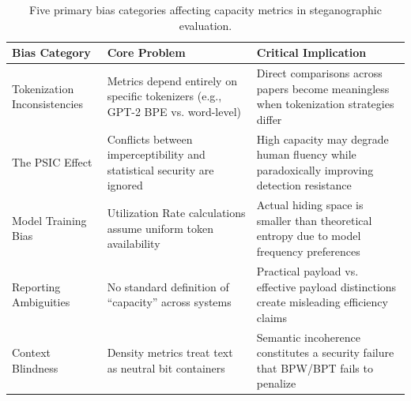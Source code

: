 \begin{table}[t]
  \centering
  \footnotesize
  \caption{Five primary bias categories affecting capacity metrics in steganographic evaluation.}
  \label{tab:capacity_bias_categories}
  \begin{tabular}{|>{\raggedright\arraybackslash}p{2cm}|>{\raggedright\arraybackslash}p{4.5cm}|>{\raggedright\arraybackslash}p{5cm}|}
    \hline
    \textbf{Bias Category}       & \textbf{Core Problem}                                                           & \textbf{Critical Implication}                                                              \\
    \hline
    Tokenization Inconsistencies & Metrics depend entirely on specific tokenizers (e.g., GPT-2 BPE vs. word-level) & Direct comparisons across papers become meaningless when tokenization strategies differ    \\
    \hline
    The PSIC Effect              & Conflicts between imperceptibility and statistical security are ignored        & High capacity may degrade human fluency while paradoxically improving detection resistance \\
    \hline
    Model Training Bias          & Utilization Rate calculations assume uniform token availability                 & Actual hiding space is smaller than theoretical entropy due to model frequency preferences \\
    \hline
    Reporting Ambiguities        & No standard definition of ``capacity'' across systems                          & Practical payload vs. effective payload distinctions create misleading efficiency claims    \\
    \hline
    Context Blindness            & Density metrics treat text as neutral bit containers                            & Semantic incoherence constitutes a security failure that BPW/BPT fails to penalize         \\
    \hline
  \end{tabular}
\end{table}

